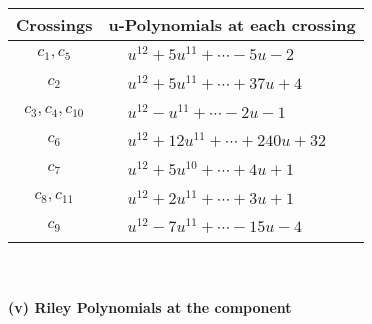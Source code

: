 \documentclass[1p]{elsarticle_modified}
\theoremstyle{definition}
\begin{document}
\begin{tabular}{m{50pt}|m{274pt}}
Crossings & \hspace{64pt}u-Polynomials at each crossing \\
\hline $$\begin{aligned}c_{1},c_{5}\end{aligned}$$&$\begin{aligned}
&u^{12}+5 u^{11}+\cdots-5 u-2
\end{aligned}$\\
\hline $$\begin{aligned}c_{2}\end{aligned}$$&$\begin{aligned}
&u^{12}+5 u^{11}+\cdots+37 u+4
\end{aligned}$\\
\hline $$\begin{aligned}c_{3},c_{4},c_{10}\end{aligned}$$&$\begin{aligned}
&u^{12}- u^{11}+\cdots-2 u-1
\end{aligned}$\\
\hline $$\begin{aligned}c_{6}\end{aligned}$$&$\begin{aligned}
&u^{12}+12 u^{11}+\cdots+240 u+32
\end{aligned}$\\
\hline $$\begin{aligned}c_{7}\end{aligned}$$&$\begin{aligned}
&u^{12}+5 u^{10}+\cdots+4 u+1
\end{aligned}$\\
\hline $$\begin{aligned}c_{8},c_{11}\end{aligned}$$&$\begin{aligned}
&u^{12}+2 u^{11}+\cdots+3 u+1
\end{aligned}$\\
\hline $$\begin{aligned}c_{9}\end{aligned}$$&$\begin{aligned}
&u^{12}-7 u^{11}+\cdots-15 u-4
\end{aligned}$\\
\hline
\end{tabular}\\~\\
\newpage\renewcommand{\arraystretch}{1}
\flushleft \textbf{(v) Riley Polynomials at the component}\newline \\
\end{document}
